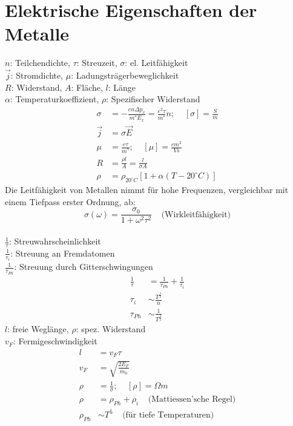 \documentclass[a4paper,twocolumn,10pt]{article}
\begin{document}
\section{Elektrische Eigenschaften der Metalle}
$n$: Teilchendichte, $\tau$: Streuzeit, $\sigma$: el. Leitfähigkeit\\
$\overrightarrow{j}$: Stromdichte, $\mu$: Ladungsträgerbeweglichkeit\\
$R$: Widerstand, $A$: Fläche, $l$: Länge\\
$\alpha$: Temperaturkoeffizient, $\rho$: Spezifischer Widerstand
\begin{equation*}
\begin{split}
\sigma&=-\frac{en\Delta p_x}{m^*E_x}=\frac{e^2\tau}{m^*}n;\;\;\;\;[\sigma]=\frac{S}{m}\\
\overrightarrow{j}&=\sigma\overrightarrow{E}\\
\mu &=\frac{e\tau}{m^*};\;\;\;\;[\mu]=\frac{cm^2}{Vs}\\
R &=\frac{\rho l}{A}=\frac{l}{\sigma A}\\
\rho&=\rho_{20^{\circ} C}[1+\alpha (T-20^{\circ} C)]
\end{split}
\end{equation*}
Die Leitfähigkeit von Metallen nimmt für hohe Frequenzen, vergleichbar mit einem Tiefpass erster Ordnung, ab:
\begin{equation*}
\sigma(\omega)=\frac{\sigma_0}{1+\omega^2\tau^2}\;\;\;\;\text{(Wirkleitfähigkeit)}
\end{equation*}\\
$\frac{1}{\tau}$: Streuwahrscheinlichkeit\\
$\frac{1}{\tau_{i}}$: Streuung an Fremdatomen\\
$\frac{1}{\tau_{Ph}}$: Streuung durch Gitterschwingungen
\begin{equation*}
\begin{split}
\frac{1}{\tau}&=\frac{1}{\tau_{Ph}}+\frac{1}{\tau_i}\\
\tau_i&\sim \frac{T^{\frac{3}{2}}}{n}\\
\tau_{Ph}&\sim\frac{1}{T^{\frac{3}{2}}}
\end{split}
\end{equation*}
$l$: freie Weglänge, $\rho$: spez. Widerstand\\
$v_F$: Fermigeschwindigkeit
\begin{equation*}
\begin{split}
l&=v_F\tau\\
v_F&=\sqrt{\frac{2E_F}{m_0}}\\
\rho &=\frac{1}{\sigma};\;\;\;\;[\rho]=\Omega m\\
\rho &=\rho_{Ph}+\rho_i\;\;\;\;\text{(Mattiessen'sche Regel)}\\
\rho_{Ph}&\sim T^5\;\;\;\;\text{(für tiefe Temperaturen)}
\end{split}
\end{equation*}
\end{document}
